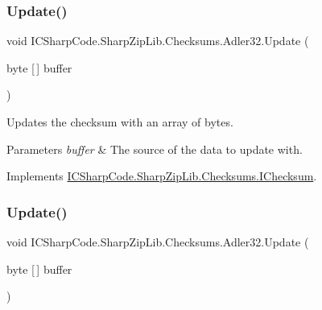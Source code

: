 \subsubsection{\texorpdfstring{Update()}{Update()}\hspace{0.1cm}{\footnotesize\ttfamily [3/6]}}
{\footnotesize\ttfamily void I\+C\+Sharp\+Code.\+Sharp\+Zip\+Lib.\+Checksums.\+Adler32.\+Update (\begin{DoxyParamCaption}\item[{byte \mbox{[}$\,$\mbox{]}}]{buffer }\end{DoxyParamCaption})\hspace{0.3cm}{\ttfamily [inline]}}



Updates the checksum with an array of bytes. 


\begin{DoxyParams}{Parameters}
{\em buffer} & The source of the data to update with. \\
\hline
\end{DoxyParams}


Implements \hyperlink{interface_i_c_sharp_code_1_1_sharp_zip_lib_1_1_checksums_1_1_i_checksum_aee26d2b3705b22ab24cc9b5eb9dbc81d}{I\+C\+Sharp\+Code.\+Sharp\+Zip\+Lib.\+Checksums.\+I\+Checksum}.

\mbox{\label{class_i_c_sharp_code_1_1_sharp_zip_lib_1_1_checksums_1_1_adler32_a37a55dd34c64e5b9ea40ef50a6e23afd}} 
\subsubsection{\texorpdfstring{Update()}{Update()}\hspace{0.1cm}{\footnotesize\ttfamily [4/6]}}
{\footnotesize\ttfamily void I\+C\+Sharp\+Code.\+Sharp\+Zip\+Lib.\+Checksums.\+Adler32.\+Update (\begin{DoxyParamCaption}\item[{byte \mbox{[}$\,$\mbox{]}}]{buffer }\end{DoxyParamCaption})\hspace{0.3cm}{\ttfamily [inline]}}



